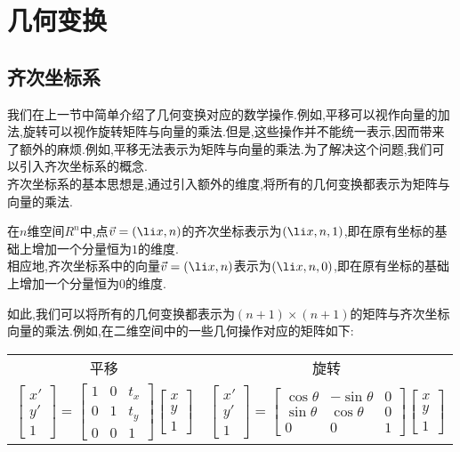 \documentclass{ctexart}
\begin{document}
\section{几何变换}
\subsection{齐次坐标系}
我们在上一节中简单介绍了几何变换对应的数学操作.例如,平移可以视作向量的加法,旋转可以视作旋转矩阵与向量的乘法.但是,这些操作并不能统一表示,因而带来了额外的麻烦.例如,平移无法表示为矩阵与向量的乘法.为了解决这个问题,我们可以引入齐次坐标系的概念.\\
\indent 齐次坐标系的基本思想是,通过引入额外的维度,将所有的几何变换都表示为矩阵与向量的乘法.
\begin{definition}[齐次坐标系]
    在$n$维空间$R^n$中,点$\vec{v}=\left(\li x,n\right)$的齐次坐标表示为$\left(\li x,n,1\right)$,即在原有坐标的基础上增加一个分量恒为$1$的维度.\\
    相应地,齐次坐标系中的向量$\vec{v}=\left(\li x,n\right)$表示为$\left(\li x,n,0\right)$,即在原有坐标的基础上增加一个分量恒为$0$的维度.
\end{definition}
如此,我们可以将所有的几何变换都表示为$(n+1)\times(n+1)$的矩阵与齐次坐标向量的乘法.例如,在二维空间中的一些几何操作对应的矩阵如下:
\begin{table}[H]\centering
    \begin{tabular}{cc}
        平移&旋转\\
        $\begin{bmatrix}
            x'\\y'\\1
        \end{bmatrix}=\begin{bmatrix}
            1&0&t_x\\0&1&t_y\\0&0&1
        \end{bmatrix}\begin{bmatrix}
            x\\y\\1
        \end{bmatrix}$&$\begin{bmatrix}
            x'\\y'\\1
        \end{bmatrix}=\begin{bmatrix}
            \cos\theta&-\sin\theta&0\\\sin\theta&\cos\theta&0\\0&0&1
        \end{bmatrix}\begin{bmatrix}
            x\\y\\1
        \end{bmatrix}$
    \end{tabular}
\end{table}
\end{document}
